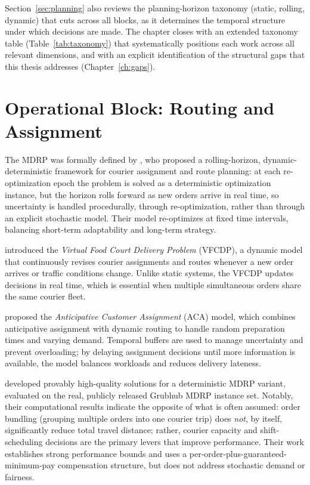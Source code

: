 \documentclass[12pt,a4paper]{report}
\begin{document}
Section~\ref{sec:planning} also reviews the planning-horizon taxonomy (static, rolling, dynamic) that cuts across all blocks, as it determines the temporal structure under which decisions are made. The chapter closes with an extended taxonomy table (Table~\ref{tab:taxonomy}) that systematically positions each work across all relevant dimensions, and with an explicit identification of the structural gaps that this thesis addresses (Chapter~\ref{ch:gaps}).

\section{Operational Block: Routing and Assignment}
\label{sec:operational}

The MDRP was formally defined by \citet{reyes2018meal}, who proposed a rolling-horizon, dynamic-deterministic framework for courier assignment and route planning: at each re-optimization epoch the problem is solved as a deterministic optimization instance, but the horizon rolls forward as new orders arrive in real time, so uncertainty is handled procedurally, through re-optimization, rather than through an explicit stochastic model. Their model re-optimizes at fixed time intervals, balancing short-term adaptability and long-term strategy.

\citet{steever2019dynamic} introduced the \emph{Virtual Food Court Delivery Problem} (VFCDP), a dynamic model that continuously revises courier assignments and routes whenever a new order arrives or traffic conditions change. Unlike static systems, the VFCDP updates decisions in real time, which is essential when multiple simultaneous orders share the same courier fleet.

\citet{ulmer2021restaurant} proposed the \emph{Anticipative Customer Assignment} (ACA) model, which combines anticipative assignment with dynamic routing to handle random preparation times and varying demand. Temporal buffers are used to manage uncertainty and prevent overloading; by delaying assignment decisions until more information is available, the model balances workloads and reduces delivery lateness.

\citet{yildiz2019provably} developed provably high-quality solutions for a deterministic MDRP variant, evaluated on the real, publicly released Grubhub MDRP instance set. Notably, their computational results indicate the opposite of what is often assumed: order bundling (grouping multiple orders into one courier trip) does \emph{not}, by itself, significantly reduce total travel distance; rather, courier capacity and shift-scheduling decisions are the primary levers that improve performance. Their work establishes strong performance bounds and uses a per-order-plus-guaranteed-minimum-pay compensation structure, but does not address stochastic demand or fairness.
\end{document}
